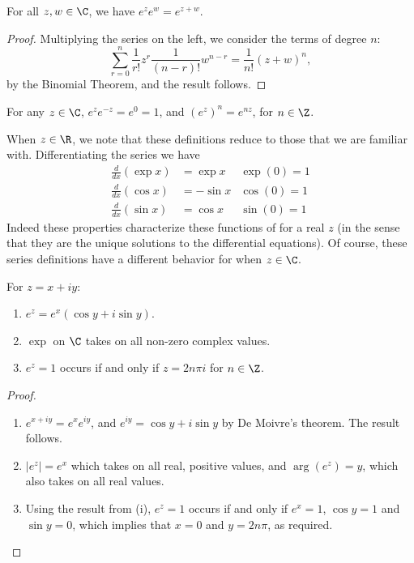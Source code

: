 \documentclass[a4]{scrreprt}
\begin{document}
\begin{proposition}
	For all $z, w \in \C$, we have $e^z e^w = e^{z + w}.$
\end{proposition}
\begin{proof}[Proof]
	Multiplying the series on the left, we consider the terms of degree $n$:
	$$
	\sum_{r=0}^{n} \frac{1}{r !} z^{r} \frac{1}{(n-r) !} w^{n-r}=\frac{1}{n !}(z+w)^{n},
	$$
	by the Binomial Theorem, and the result follows.
\end{proof}

\begin{corollary}
	For any $z \in \C$, $e^z e^{-z} = e^0 = 1$, and $(e^{z})^n = e^{nz}$, for $n \in \Z$.
\end{corollary}

When $z \in \R$, we note that these definitions reduce to those that we are familiar with. Differentiating the series we have
\begin{align*}
\frac{d}{dx}(\exp x) &= \exp x  & \exp(0) = 1\\
\frac{d}{dx}(\cos x) &= -\sin x  & \cos(0) = 1\\
\frac{d}{dx}(\sin x) &= \cos x  & \sin(0) = 1
\end{align*}
Indeed these properties characterize these functions of for a real $z$ (in the sense that they are the unique solutions to the differential equations).
Of course, these series definitions have a different behavior for when $z \in \C$.

\begin{lemma}\label{lemma:properties-of-exp}
	For $z = x + iy$:
	\begin{enumerate}[label=(\roman*)]
		\item $e^z = e^x ( \cos y + i \sin y)$.
		\item $\exp$ on $\C$ takes on all non-zero complex values.
		\item $e^z = 1$ occurs if and only if $z = 2 n \pi i$ for $n \in \Z$. 
	\end{enumerate}
\end{lemma}
\begin{proof}$ $ \phantom{\qedhere}
	\begin{enumerate}[label=(\roman*)]
		\item $e^{x + iy} = e^{x} e^{iy}$, and $e^{iy} = \cos y + i \sin y$ by De Moivre's theorem. The result follows.
		\item $|e^z| = e^x$ which takes on all real, positive values, and $\arg(e^z) = y$, which also takes on all real values.
		\item Using the result from (i), $e^{z} = 1$ occurs if and only if $e^x = 1$, $\cos y = 1$ and $\sin y = 0$, which implies that $x = 0$ and $y = 2 n \pi$, as required. 
 	\end{enumerate}
\end{proof}
\end{document}

